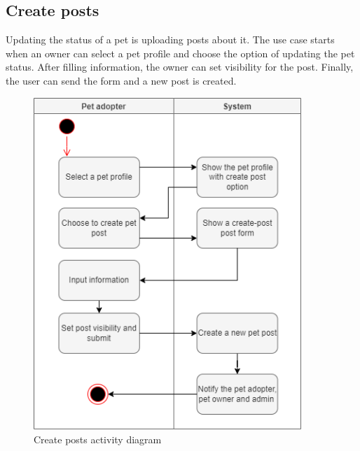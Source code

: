 \subsection{Create posts}
Updating the status of a pet is uploading posts about it. The use case starts when an owner can select a pet profile and choose the option of updating the pet status. After filling information, the owner can set visibility for the post. Finally, the user can send the form and a new post is created.
\begin{figure}[H]
  \centering
  \includegraphics[width=0.9\textwidth]{Figures/create-pet-post.png}
  \caption{Create posts activity diagram}
  \label{fig:create-post}
\end{figure}
\newpage


